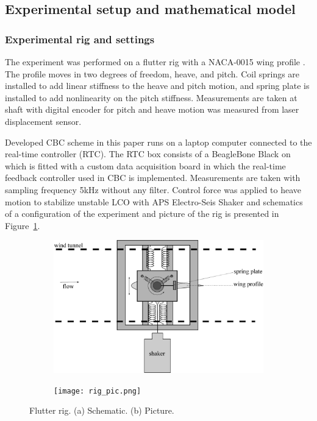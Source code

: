 \documentclass[openacc]{rsproca_new}%
\theoremstyle{own}
\newcommand{\Fref}[1]{Figure~\ref{#1}}
\begin{document}
\subsection{Experimental setup and mathematical model}\label{model}
\subsubsection{Experimental rig and settings}\label{setup}
The experiment was performed on a flutter rig with a NACA-0015 wing profile \cite{jacobs1933characteristics}. The profile moves in two degrees of freedom, heave, and pitch. Coil springs are installed to add linear stiffness to the heave and pitch motion, and spring plate is installed to add nonlinearity on the pitch stiffness. Measurements are taken at shaft with digital encoder for pitch and heave motion was measured from laser displacement sensor.

Developed CBC scheme in this paper runs on a laptop computer connected to the real-time controller (RTC). The RTC box consists of a BeagleBone Black on which is fitted with a custom data acquisition board \cite{rtc2} in which the real-time feedback controller used in CBC is implemented. Measurements are taken with sampling frequency  5kHz without any filter.  Control force was applied to heave motion to stabilize unstable LCO with APS Electro-Seis Shaker and schematics of a configuration of the experiment and picture of the rig is presented in \Fref{f:rig}.

\begin{figure}
  \centering
  \begin{subfigure}[b]{0.5\linewidth}
    \includegraphics[width=\linewidth]{flutter_rig.eps}
    \caption{}
  \end{subfigure}
  \begin{subfigure}[b]{0.45\linewidth}
    \texttt{[image: rig\_pic.png]}
    \caption{}
  \end{subfigure}
  \caption{Flutter rig. (a) Schematic. (b) Picture.}
  \label{f:rig}
\end{figure}
\end{document}
